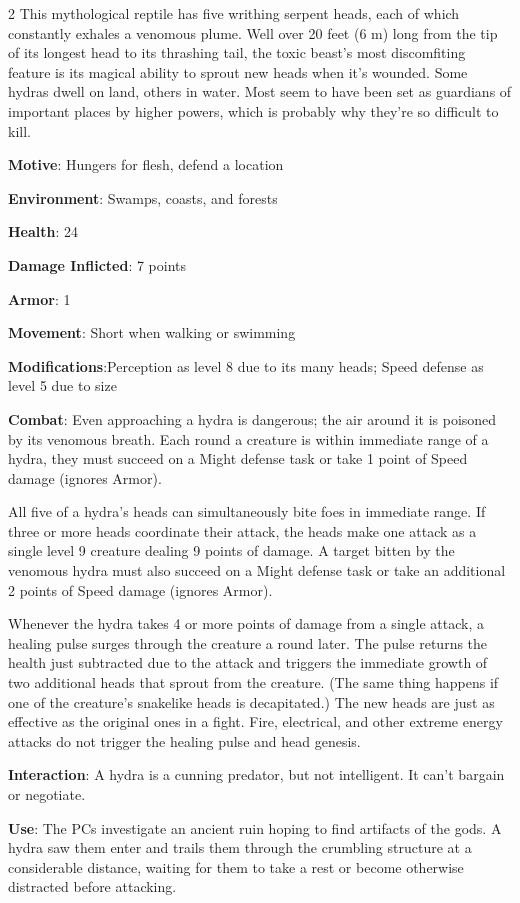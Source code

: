 \begin{multicols}{2}
This mythological reptile has five writhing serpent heads, each of which constantly exhales a venomous plume. Well over 20 feet (6 m) long from the tip of its longest head to its thrashing tail, the toxic beast’s most discomfiting feature is its magical ability to sprout new heads when it’s wounded. Some hydras dwell on land, others in water. Most seem to have been set as guardians of important places by higher powers, which is probably why they’re so difficult to kill. 

\textbf{Motive}: Hungers for flesh, defend a location 

\textbf{Environment}: Swamps, coasts, and forests 

\textbf{Health}: 24 

\textbf{Damage Inflicted}: 7 points 

\textbf{Armor}: 1 

\textbf{Movement}: Short when walking or swimming 

\textbf{Modifications}:Perception as level 8 due to its many heads; Speed defense as level 5 due to size 

\textbf{Combat}: Even approaching a hydra is dangerous; the air around it is poisoned by its venomous breath. Each round a creature is within immediate range of a hydra, they must succeed on a Might defense task or take 1 point of Speed damage (ignores Armor). 

All five of a hydra’s heads can simultaneously bite foes in immediate range. If three or more heads coordinate their attack, the heads make one attack as a single level 9 creature dealing 9 points of damage. A target bitten by the venomous hydra must also succeed on a Might defense task or take an additional 2 points of Speed damage (ignores Armor). 

Whenever the hydra takes 4 or more points of damage from a single attack, a healing pulse surges through the creature a round later. The pulse returns the health just subtracted due to the attack and triggers the immediate growth of two additional heads that sprout from the creature. (The same thing happens if one of the creature’s snakelike heads is decapitated.) The new heads are just as effective as the original ones in a fight. Fire, electrical, and other extreme energy attacks do not trigger the healing pulse and head genesis. 

\textbf{Interaction}: A hydra is a cunning predator, but not intelligent. It can’t bargain or negotiate. 

\textbf{Use}: The PCs investigate an ancient ruin hoping to find artifacts of the gods. A hydra saw them enter and trails them through the crumbling structure at a considerable distance, waiting for them to take a rest or become otherwise distracted before attacking.


\end{multicols}
